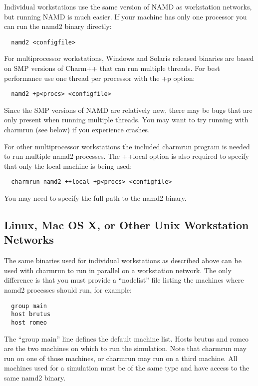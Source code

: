 Individual workstations use the same version of NAMD as workstation
networks, but running NAMD is much easier.  If your machine has only
one processor you can run the namd2 binary directly:

\begin{verbatim}
  namd2 <configfile>
\end{verbatim}

For multiprocessor workstations, Windows and Solaris released binaries
are based on SMP versions of Charm++ that can run multiple threads.
For best performance use one thread per processor with the +p option:

\begin{verbatim}
  namd2 +p<procs> <configfile>
\end{verbatim}

Since the SMP versions of NAMD are relatively new, there may be bugs
that are only present when running multiple threads.  You may want to
try running with charmrun (see below) if you experience crashes.

For other multiprocessor workstations the included charmrun program is
needed to run multiple namd2 processes.  The ++local option is also
required to specify that only the local machine is being used:

\begin{verbatim}
  charmrun namd2 ++local +p<procs> <configfile>
\end{verbatim}

You may need to specify the full path to the namd2 binary.

\subsection{Linux, Mac OS X, or Other Unix Workstation Networks}

The same binaries used for individual workstations as described above
can be used with charmrun to run in parallel on a workstation network.
The only difference is that you must provide a ``nodelist'' file listing
the machines where namd2 processes should run, for example:

\begin{verbatim}
  group main
  host brutus
  host romeo
\end{verbatim}

The ``group main'' line defines the default machine list.  Hosts brutus
and romeo are the two machines on which to run the simulation.  Note
that charmrun may run on one of those machines, or charmrun may run
on a third machine.  All machines used for a simulation must be of the
same type and have access to the same namd2 binary.

